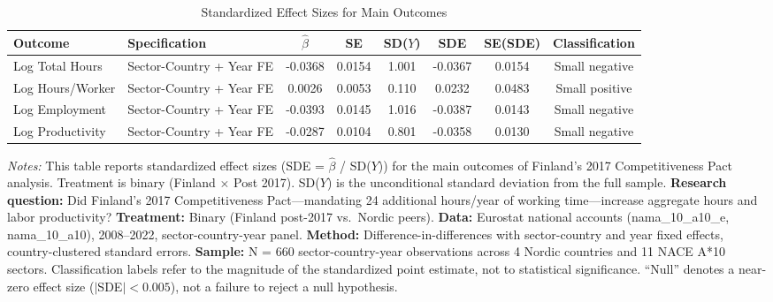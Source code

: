 \begin{table}[H]
\centering
\caption{Standardized Effect Sizes for Main Outcomes}
\label{tab:sde}
\begin{adjustbox}{max width=\textwidth}
\begin{tabular}{llcccccc}
\toprule
Outcome & Specification & $\hat{\beta}$ & SE & SD($Y$) & SDE & SE(SDE) & Classification \\
\midrule
Log Total Hours & Sector-Country + Year FE & -0.0368 & 0.0154 & 1.001 & -0.0367 & 0.0154 & Small negative \\
Log Hours/Worker & Sector-Country + Year FE & 0.0026 & 0.0053 & 0.110 & 0.0232 & 0.0483 & Small positive \\
Log Employment & Sector-Country + Year FE & -0.0393 & 0.0145 & 1.016 & -0.0387 & 0.0143 & Small negative \\
Log Productivity & Sector-Country + Year FE & -0.0287 & 0.0104 & 0.801 & -0.0358 & 0.0130 & Small negative \\
\bottomrule
\end{tabular}
\end{adjustbox}
\par\vspace{0.3em}
{\footnotesize \emph{Notes:} This table reports standardized effect sizes (SDE = $\hat{\beta}$ / SD($Y$)) for the main outcomes of Finland's 2017 Competitiveness Pact analysis. Treatment is binary (Finland $\times$ Post 2017). SD($Y$) is the unconditional standard deviation from the full sample. \textbf{Research question:} Did Finland's 2017 Competitiveness Pact---mandating 24 additional hours/year of working time---increase aggregate hours and labor productivity? \textbf{Treatment:} Binary (Finland post-2017 vs.~Nordic peers). \textbf{Data:} Eurostat national accounts (nama\_10\_a10\_e, nama\_10\_a10), 2008--2022, sector-country-year panel. \textbf{Method:} Difference-in-differences with sector-country and year fixed effects, country-clustered standard errors. \textbf{Sample:} N = 660 sector-country-year observations across 4 Nordic countries and 11 NACE A*10 sectors. Classification labels refer to the magnitude of the standardized point estimate, not to statistical significance. ``Null'' denotes a near-zero effect size ($|$SDE$| < 0.005$), not a failure to reject a null hypothesis.}
\end{table}
